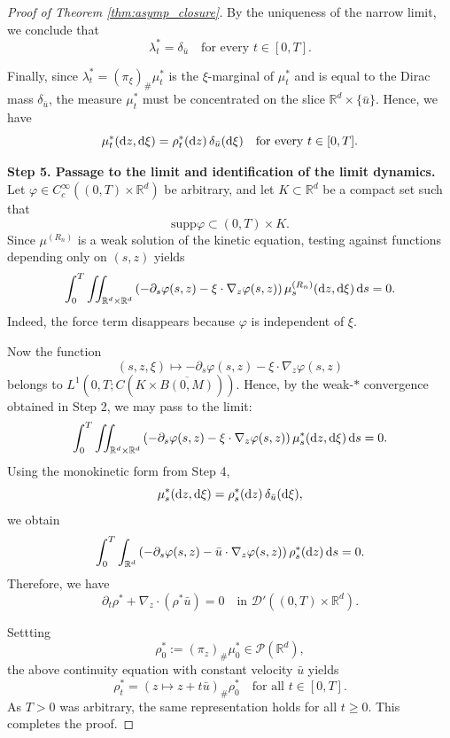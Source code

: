 \documentclass[10pt,reqno]{amsart}
\renewcommand{\ge}{\geqslant}
\numberwithin{equation}{section}
\newcommand{\R}{\mathbb R}
\newcommand{\lt}{\left}
\newcommand{\rt}{\right}
\newcommand{\intr}{\int_{\R^d}}
\newcommand{\intrr}{\iint_{\R^d \times \R^d}}
\newcommand{\calD}{\mathcal D}
\newcommand{\calP}{\mathcal P}
\newcommand{\rd}{\textnormal{d}}
\newcommand{\supp}{\text{supp}}
\begin{document}
\begin{proof}[Proof of Theorem \ref{thm:asymp_closure}]
By the uniqueness of the narrow limit, we conclude that
\[
\lambda^\ast_t=\delta_{\bar u} \quad\text{for every }t\in[0,T].
\]

Finally, since $\lambda^\ast_t=(\pi_\xi)_\#\mu^\ast_t$ is the $\xi$-marginal of $\mu^\ast_t$
and is equal to the Dirac mass $\delta_{\bar u}$, the measure $\mu^\ast_t$ must be concentrated on the slice
$\R^d\times\{\bar u\}$. Hence, we have
\[
\mu^\ast_t(\rd z,\rd\xi)=\rho^\ast_t(\rd z)\,\delta_{\bar u}(\rd\xi)
\quad\text{for every }t\in[0,T].
\]

\medskip
\noindent\textbf{Step 5. Passage to the limit and identification of the limit dynamics.}
Let $\varphi\in C_c^\infty((0,T)\times\R^d)$ be arbitrary, and let
$K\subset\R^d$ be a compact set such that
\[
\supp\varphi\subset (0,T)\times K.
\]
Since $\mu^{(R_n)}$ is a weak solution of the kinetic equation, testing against
functions depending only on $(s,z)$ yields
\[
\int_0^T\intrr
\lt(-\partial_s\varphi(s,z)-\xi\cdot\nabla_z\varphi(s,z)\rt) \mu^{(R_n)}_s(\rd z,\rd\xi)\,\rd s=0.
\]
Indeed, the force term disappears because $\varphi$ is independent of $\xi$.

Now the function
\[
(s,z,\xi)\mapsto -\partial_s\varphi(s,z)-\xi\cdot\nabla_z\varphi(s,z)
\]
belongs to $L^1(0,T;C(K\times\overline{B(0,M)}))$.
Hence, by the weak-$\ast$ convergence obtained in Step 2, we may pass to the limit:
\[
\int_0^T\intrr \lt(-\partial_s\varphi(s,z)-\xi\cdot\nabla_z\varphi(s,z)\rt) \mu^\ast_s(\rd z,\rd\xi)\,\rd s=0.
\]
Using the monokinetic form from Step 4,
\[
\mu^\ast_s(\rd z,\rd\xi)=\rho^\ast_s(\rd z)\,\delta_{\bar u}(\rd\xi),
\]
we obtain
\[
\int_0^T\intr \lt(-\partial_s\varphi(s,z)-\bar u\cdot\nabla_z\varphi(s,z)\rt) \rho^\ast_s(\rd z)\,\rd s=0.
\]
Therefore, we have
\[
\partial_t\rho^\ast + \nabla_z \cdot (\rho^\ast \bar u)=0 \quad\text{in }\calD'((0,T)\times\R^d).
\]

Settting
\[
\rho^\ast_0 := (\pi_z)_\#\mu^\ast_0 \in \calP(\R^d),
\]
the above continuity equation with constant velocity $\bar u$ yields
\[
\rho^\ast_t=(z\mapsto z+t\bar u)_\#\rho^\ast_0 \quad\text{for all }t\in[0,T].
\]
As $T>0$ was arbitrary, the same representation holds for all $t\ge0$.
This completes the proof.
\end{proof}
\end{document}
